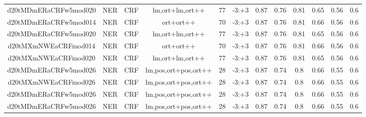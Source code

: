 \documentclass[a4paper]{article}
\begin{document}
\begin{landscape}
\begin{center}
\begin{tabular}{ |c|c|c|c|c|c|c|c|c|c|c|c|}
 
 	
 	\small{ d20tMDmERaCRFw5mod020 } & \small{ NER} & \small{  CRF }  & lm,ort+lm,ort++  &  77 &  \small{  -3:+3 }  &  0.87 & 0.76 & 0.81  &  0.65 & 0.56 & 0.6 \\
 	

 
 	
 	\small{ d20tMDmERaCRFw5mod014 } & \small{ NER} & \small{  CRF }  & ort+ort++  &  70 &  \small{  -3:+3 }  &  0.87 & 0.76 & 0.81  &  0.66 & 0.56 & 0.6 \\
 	

 
 	
 	\small{ d20tMDmERaCRFw5mod020 } & \small{ NER} & \small{  CRF }  & lm,ort+lm,ort++  &  77 &  \small{  -3:+3 }  &  0.87 & 0.76 & 0.81  &  0.65 & 0.56 & 0.6 \\
 	

 
 	
 	\small{ d20tMXmNWEaCRFmod014 } & \small{ NER} & \small{  CRF }  & ort+ort++  &  70 &  \small{  -3:+3 }  &  0.87 & 0.76 & 0.81  &  0.66 & 0.56 & 0.6 \\
 	

 
 	
 	\small{ d20tMXmNWEaCRFmod020 } & \small{ NER} & \small{  CRF }  & lm,ort+lm,ort++  &  77 &  \small{  -3:+3 }  &  0.87 & 0.76 & 0.81  &  0.65 & 0.56 & 0.6 \\
 	

 
 	
 	\small{ d20tMDmERaCRFw5mod026 } & \small{ NER} & \small{  CRF }  & lm,pos,ort+pos,ort++  &  28 &  \small{  -3:+3 }  &  0.87 & 0.74 & 0.8  &  0.66 & 0.55 & 0.6 \\
 	

 
 	
 	\small{ d20tMXmNWEaCRFmod026 } & \small{ NER} & \small{  CRF }  & lm,pos,ort+pos,ort++  &  28 &  \small{  -3:+3 }  &  0.87 & 0.74 & 0.8  &  0.66 & 0.55 & 0.6 \\
 	

 
 	
 	\small{ d20tMDmERaCRFw5mod026 } & \small{ NER} & \small{  CRF }  & lm,pos,ort+pos,ort++  &  28 &  \small{  -3:+3 }  &  0.87 & 0.74 & 0.8  &  0.66 & 0.55 & 0.6 \\
 	

 
 	
 	\small{ d20tMDmERaCRFw5mod026 } & \small{ NER} & \small{  CRF }  & lm,pos,ort+pos,ort++  &  28 &  \small{  -3:+3 }  &  0.87 & 0.74 & 0.8  &  0.66 & 0.55 & 0.6 \\
 	


\end{tabular}
\end{center}
\end{landscape}
\end{document}
